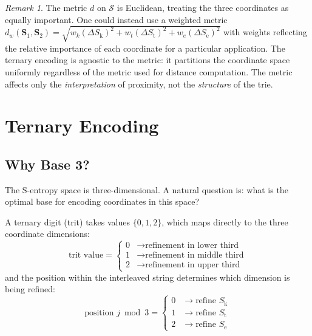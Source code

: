\documentclass[11pt,a4paper]{article}
\theoremstyle{definition}
\theoremstyle{remark}
\newtheorem{remark}[theorem]{Remark}
\newcommand{\Sk}{S_{\mathrm{k}}}
\newcommand{\St}{S_{\mathrm{t}}}
\newcommand{\Se}{S_{\mathrm{e}}}
\newcommand{\Sspace}{\mathcal{S}}
\begin{document}
\begin{remark}
The metric $d$ on $\Sspace$ is Euclidean, treating the three coordinates as equally important. One could instead use a weighted metric $d_w(\mathbf{S}_1, \mathbf{S}_2) = \sqrt{w_k(\Delta \Sk)^2 + w_t(\Delta \St)^2 + w_e(\Delta \Se)^2}$ with weights reflecting the relative importance of each coordinate for a particular application. The ternary encoding is agnostic to the metric: it partitions the coordinate space uniformly regardless of the metric used for distance computation. The metric affects only the \emph{interpretation} of proximity, not the \emph{structure} of the trie.
\end{remark}

\section{Ternary Encoding}
\label{sec:ternary}

\subsection{Why Base 3?}

The S-entropy space is three-dimensional. A natural question is: what is the optimal base for encoding coordinates in this space?

A ternary digit (trit) takes values $\{0, 1, 2\}$, which maps directly to the three coordinate dimensions:
\begin{equation}
\text{trit value} = \begin{cases}
0 & \to \text{refinement in lower third} \\
1 & \to \text{refinement in middle third} \\
2 & \to \text{refinement in upper third}
\end{cases}
\label{eq:trit_values}
\end{equation}
and the position within the interleaved string determines which dimension is being refined:
\begin{equation}
\text{position } j \bmod 3 = \begin{cases}
0 & \to \text{refine } \Sk \\
1 & \to \text{refine } \St \\
2 & \to \text{refine } \Se
\end{cases}
\label{eq:dimension_assignment}
\end{equation}
\end{document}
